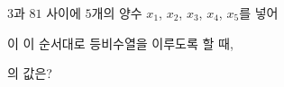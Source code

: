 $3$과 $81$ 사이에 $5$개의 양수 $x_1$, $x_2$, $x_3$, $x_4$, $x_5$를 넣어\par\smallskip{}\par\smallskip\noindent 이 이 순서대로 등비수열을 이루도록 할 때,\par\smallskip{}\par\smallskip\noindent 의 값은?
